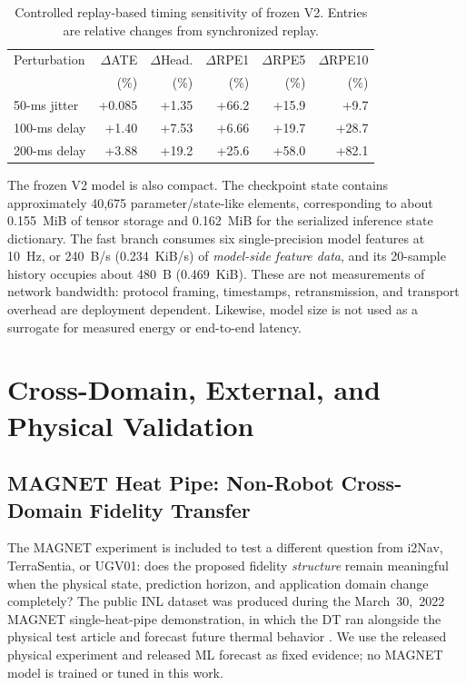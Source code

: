 \documentclass[journal]{IEEEtran}
\begin{document}
\begin{table}[t]
\caption{Controlled replay-based timing sensitivity of frozen V2. Entries are relative changes from synchronized replay.}
\label{tab:timing}
\centering
\scriptsize
\setlength{\tabcolsep}{2.4pt}
\begin{tabular}{lrrrrr}
\toprule
Perturbation & $\Delta$ATE & $\Delta$Head. & $\Delta$RPE1 & $\Delta$RPE5 & $\Delta$RPE10 \\
 & (\%) & (\%) & (\%) & (\%) & (\%) \\
\midrule
50-ms jitter & +0.085 & +1.35 & +66.2 & +15.9 & +9.7 \\
100-ms delay & +1.40 & +7.53 & +6.66 & +19.7 & +28.7 \\
200-ms delay & +3.88 & +19.2 & +25.6 & +58.0 & +82.1 \\
\bottomrule
\end{tabular}
\end{table}

The frozen V2 model is also compact. The checkpoint state contains approximately 40,675 parameter/state-like elements, corresponding to about 0.155~MiB of tensor storage and 0.162~MiB for the serialized inference state dictionary. The fast branch consumes six single-precision model features at 10~Hz, or 240~B/s (0.234~KiB/s) of \emph{model-side feature data}, and its 20-sample history occupies about 480~B (0.469~KiB). These are not measurements of network bandwidth: protocol framing, timestamps, retransmission, and transport overhead are deployment dependent. Likewise, model size is not used as a surrogate for measured energy or end-to-end latency.

\section{Cross-Domain, External, and Physical Validation}

\subsection{MAGNET Heat Pipe: Non-Robot Cross-Domain Fidelity Transfer}
\label{sec:magnet}
The MAGNET experiment is included to test a different question from i2Nav, TerraSentia, or UGV01: does the proposed fidelity \emph{structure} remain meaningful when the physical state, prediction horizon, and application domain change completely? The public INL dataset was produced during the March~30,~2022 MAGNET single-heat-pipe demonstration, in which the DT ran alongside the physical test article and forecast future thermal behavior \cite{wilsdon2023magnet,inlmagnetdata}. We use the released physical experiment and released ML forecast as fixed evidence; no MAGNET model is trained or tuned in this work.
\end{document}
